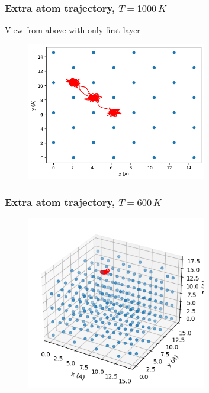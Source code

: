 \documentclass{beamer}
\begin{document}
\begin{frame}
    \frametitle{Extra atom trajectory, $T=1000\,K$}

    \centering View from above with only first layer
    \begin{figure}
        \includegraphics[width=0.7\textwidth]{images/extra1000kabove.png}
    \end{figure}

\end{frame}

\begin{frame}
    \frametitle{Extra atom trajectory, $T=600\,K$}

    \begin{figure}
        \includegraphics[width=0.7\textwidth]{images/extra600k3d.png}
    \end{figure}

\end{frame}
\end{document}
